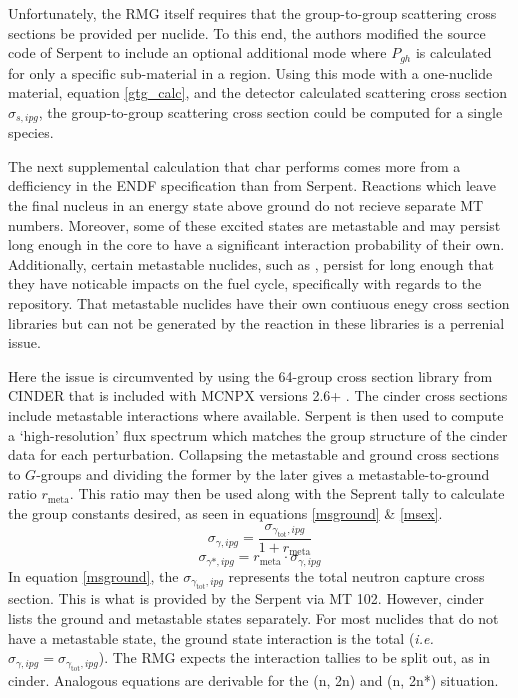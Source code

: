 Unfortunately, the RMG itself requires that the group-to-group scattering cross sections be provided 
per nuclide. To this end, the authors modified the source code of Serpent to include an optional 
additional mode where $P_{gh}$ is calculated for only a specific sub-material in a region.    
Using this mode with a one-nuclide material, equation \ref{gtg_calc}, and the detector calculated
scattering cross section $\sigma_{s,ipg}$, the group-to-group scattering cross section could 
be computed for a single species.

The next supplemental calculation that char performs comes more from a defficiency in the 
ENDF specification than from Serpent.  Reactions which leave the final nucleus in an energy
state above ground do not recieve separate MT numbers.  Moreover, some of these excited states
are metastable and may persist long enough in the core to have a significant interaction 
probability of their own.  Additionally, certain metastable nuclides, such as \superscript{*},
persist for long enough that they have noticable impacts on the fuel cycle, specifically with regards to 
the repository.  That metastable nuclides have their own contiuous enegy cross section libraries
but can not be generated by the reaction in these libraries is a perrenial issue.

Here the issue is circumvented by using the 64-group cross section library from CINDER that is 
included with MCNPX versions 2.6+ \cite{Pelowitz2008}.  The cinder cross sections include metastable
interactions where available.  Serpent is then used to compute a `high-resolution' 
flux spectrum which matches the group structure of the cinder data for each perturbation.  
Collapsing the metastable and ground cross sections to $G$-groups and dividing the former by 
the later gives a metastable-to-ground ratio $r_{\mbox{meta}}$.  This ratio may then be used along with 
the Seprent tally to calculate the group constants desired, as seen in equations \ref{msground} \& 
\ref{msex}.
\begin{equation}
\label{msground}
\sigma_{\gamma,ipg} = \frac{\sigma_{\gamma_{\mbox{tot}},ipg}}{1 + r_{\mbox{meta}}}
\end{equation}
\begin{equation}
\label{msex}
\sigma_{\gamma*,ipg} = r_{\mbox{meta}} \cdot \sigma_{\gamma,ipg}
\end{equation}
In equation \ref{msground}, the $\sigma_{\gamma_{\mbox{tot}},ipg}$ represents the total neutron
capture cross section.  This is what is provided by the Serpent via MT 102.  However, cinder 
lists the ground and metastable states separately.  For most nuclides that do not have a metastable state, the 
ground state interaction is the total (\emph{i.e.} $\sigma_{\gamma,ipg} = \sigma_{\gamma_{\mbox{tot}},ipg}$).
The RMG expects the interaction tallies to be split out, as in cinder.  Analogous equations are 
derivable for the (n, 2n) and (n, 2n*) situation.

